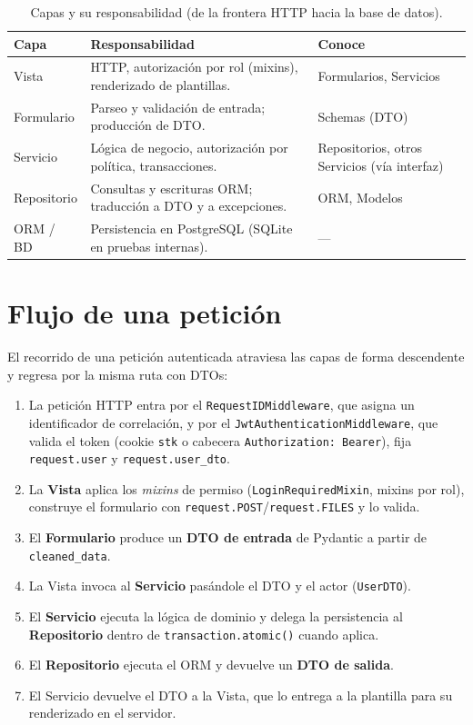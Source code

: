 \documentclass[12pt,letterpaper]{report}
\begin{document}
\begin{table}[H]
\centering
\caption{Capas y su responsabilidad (de la frontera HTTP hacia la base de datos).}
\begin{tabularx}{\textwidth}{L{3.2cm} X L{3.6cm}}
\toprule
\textbf{Capa} & \textbf{Responsabilidad} & \textbf{Conoce} \\
\midrule
Vista        & HTTP, autorización por rol (mixins), renderizado de plantillas. & Formularios, Servicios \\
Formulario   & Parseo y validación de entrada; producción de DTO. & Schemas (DTO) \\
Servicio     & Lógica de negocio, autorización por política, transacciones. & Repositorios, otros Servicios (vía interfaz) \\
Repositorio  & Consultas y escrituras ORM; traducción a DTO y a excepciones. & ORM, Modelos \\
ORM / BD     & Persistencia en PostgreSQL (SQLite en pruebas internas). & --- \\
\bottomrule
\end{tabularx}
\end{table}

\section{Flujo de una petición}

El recorrido de una petición autenticada atraviesa las capas de forma
descendente y regresa por la misma ruta con DTOs:

\begin{enumerate}[leftmargin=1.6em]
  \item La petición HTTP entra por el \texttt{RequestIDMiddleware}, que asigna
  un identificador de correlación, y por el \texttt{JwtAuthenticationMiddleware},
  que valida el token (cookie \texttt{stk} o cabecera \texttt{Authorization: Bearer}),
  fija \texttt{request.user} y \texttt{request.user\_dto}.
  \item La \textbf{Vista} aplica los \textit{mixins} de permiso
  (\texttt{LoginRequiredMixin}, mixins por rol), construye el formulario con
  \texttt{request.POST}/\texttt{request.FILES} y lo valida.
  \item El \textbf{Formulario} produce un \textbf{DTO de entrada} de Pydantic a
  partir de \texttt{cleaned\_data}.
  \item La Vista invoca al \textbf{Servicio} pasándole el DTO y el actor
  (\texttt{UserDTO}).
  \item El \textbf{Servicio} ejecuta la lógica de dominio y delega la persistencia
  al \textbf{Repositorio} dentro de \texttt{transaction.atomic()} cuando aplica.
  \item El \textbf{Repositorio} ejecuta el ORM y devuelve un \textbf{DTO de salida}.
  \item El Servicio devuelve el DTO a la Vista, que lo entrega a la plantilla para
  su renderizado en el servidor.
\end{enumerate}
\end{document}
